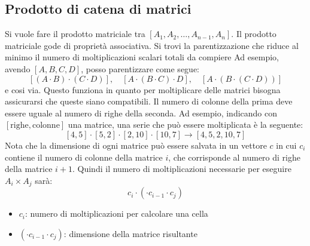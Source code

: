 \subsection{Prodotto di catena di matrici}
Si vuole fare il prodotto matriciale tra $ \left[A_1, A_2,  \ldots, A_{n-1}, A_n \right] $. Il prodotto matriciale gode di proprietà associativa. Si trovi la parentizzazione che riduce al minimo il numero di moltiplicazioni scalari totali da compiere
\vskip3mm
Ad esempio, avendo $ \left[A, B, C, D\right] $, posso parentizzare come segue:
\[
	\left[\left(A \cdot B\right) \cdot \left(C \cdot D\right)\right], \quad \left[A \cdot \left(B \cdot C \right) \cdot D\right], \quad \left[A \cdot \left(B \cdot \left(C  \cdot D\right)\right)\right]
\]
e cosi via. Questo funziona in quanto per moltiplicare delle matrici bisogna assicurarsi che queste siano compatibili. Il numero di colonne della prima deve essere uguale al numero di righe della seconda. Ad esempio, indicando con $ \left[\text{righe}, \text{colonne}\right] $ una matrice, una serie che può essere moltiplicata è la seguente:
\[
	\left[4,5\right] \cdot \left[5, 2\right] \cdot \left[2, 10\right]  \cdot \left[10, 7\right] \rightarrow \left[4,5,2,10,7\right]
\]
\vskip3mm
Nota che la dimensione di ogni matrice può essere salvata in un vettore $ c $ in cui $ c_i $ contiene il numero di colonne della matrice $ i $, che corrisponde al numero di righe della matrice $ i+1 $. Quindi il numero di moltiplicazioni necessarie per eseguire $ A_i \times A_j $ sarà:
\[
	c_i \cdot (\cdot c_{i-1} \cdot c_j)
\]
\begin{itemize}
	\item $ c_i $: numero di moltiplicazioni per calcolare una cella
	\item $ (\cdot c_{i-1} \cdot c_j) $: dimensione della matrice risultante
\end{itemize}

